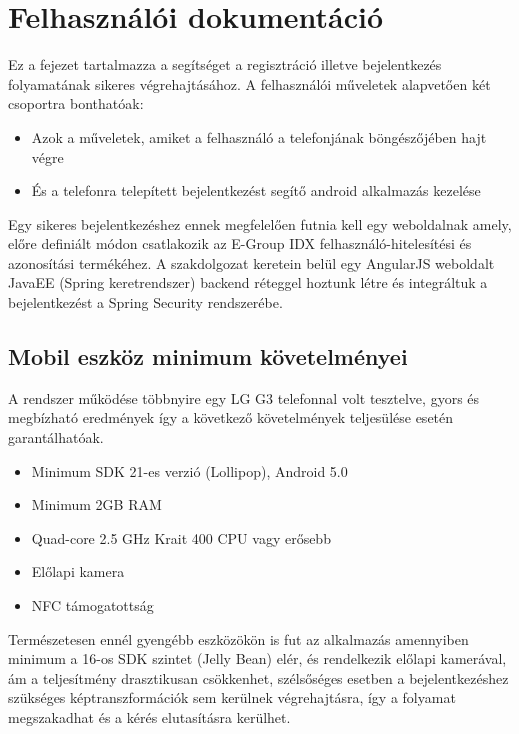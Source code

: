\section{Felhasználói dokumentáció}
Ez a fejezet tartalmazza a segítséget a regisztráció illetve bejelentkezés folyamatának sikeres végrehajtásához. A felhasználói műveletek alapvetően két csoportra bonthatóak:
\begin{itemize}
\item Azok a műveletek, amiket a felhasználó a telefonjának böngészőjében hajt végre
\item És a telefonra telepített bejelentkezést segítő android alkalmazás kezelése
\end{itemize}

Egy sikeres bejelentkezéshez ennek megfelelően futnia kell egy weboldalnak amely, előre definiált módon csatlakozik az E-Group IDX felhasználó-hitelesítési és azonosítási termékéhez.
A szakdolgozat keretein belül egy AngularJS weboldalt JavaEE (Spring keretrendszer) backend réteggel hoztunk létre és integráltuk a bejelentkezést a Spring Security rendszerébe.

\subsection{Mobil eszköz minimum követelményei}
A rendszer működése többnyire egy LG G3 telefonnal volt tesztelve, gyors és megbízható eredmények így a következő követelmények teljesülése esetén garantálhatóak.
\begin{itemize}
\item Minimum SDK 21-es verzió (Lollipop), Android 5.0
\item Minimum 2GB RAM
\item Quad-core 2.5 GHz Krait 400 CPU vagy erősebb
\item Előlapi kamera
\item NFC támogatottság
\end{itemize}

Természetesen ennél gyengébb eszközökön is fut az alkalmazás amennyiben minimum a 16-os SDK szintet (Jelly Bean) elér, és rendelkezik előlapi kamerával, ám a teljesítmény drasztikusan csökkenhet, szélsőséges esetben a bejelentkezéshez szükséges képtranszformációk sem kerülnek végrehajtásra, így a folyamat megszakadhat és a kérés elutasításra kerülhet.

